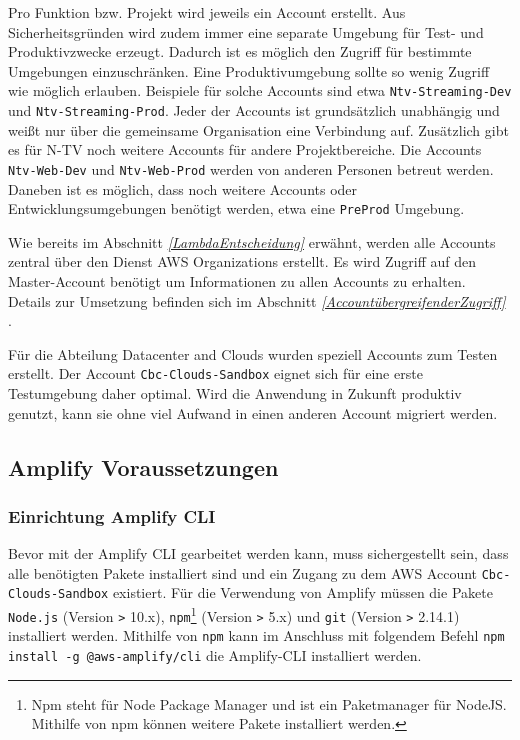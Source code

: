 Pro Funktion bzw. Projekt wird jeweils ein Account erstellt.
Aus Sicherheitsgründen wird zudem immer eine separate Umgebung für Test- und Produktivzwecke erzeugt.
Dadurch ist es möglich den Zugriff für bestimmte Umgebungen einzuschränken.
Eine Produktivumgebung sollte so wenig Zugriff wie möglich erlauben.
Beispiele für solche Accounts sind etwa \verb+Ntv-Streaming-Dev+ und \verb+Ntv-Streaming-Prod+.
Jeder der Accounts ist grundsätzlich unabhängig und weißt nur über die gemeinsame Organisation eine Verbindung auf.
Zusätzlich gibt es für N-TV noch weitere Accounts für andere Projektbereiche.
Die Accounts \verb+Ntv-Web-Dev+ und \verb+Ntv-Web-Prod+ werden von anderen Personen betreut werden.
Daneben ist es möglich, dass noch weitere Accounts oder Entwicklungsumgebungen benötigt werden, etwa eine \verb+PreProd+ Umgebung.

Wie bereits im Abschnitt \textit{\ref{LambdaEntscheidung} } erwähnt, werden alle Accounts zentral über den Dienst AWS Organizations erstellt.
Es wird Zugriff auf den Master-Account benötigt um Informationen zu allen Accounts zu erhalten.
Details zur Umsetzung befinden sich im Abschnitt \textit{\ref{AccountübergreifenderZugriff} }.

Für die Abteilung Datacenter and Clouds wurden speziell Accounts zum Testen erstellt.
Der Account \verb+Cbc-Clouds-Sandbox+ eignet sich für eine erste Testumgebung daher optimal.
Wird die Anwendung in Zukunft produktiv genutzt, kann sie ohne viel Aufwand in einen anderen Account migriert werden.


\subsection{Amplify Voraussetzungen}

\subsubsection{Einrichtung Amplify CLI}
\label{EinrichtungAmplify}
Bevor mit der Amplify CLI gearbeitet werden kann, muss sichergestellt sein, dass alle benötigten Pakete installiert sind und ein Zugang zu dem AWS Account \verb+Cbc-Clouds-Sandbox+ existiert.
Für die Verwendung von Amplify müssen die Pakete \verb+Node.js+ (Version \verb+>+ 10.x), \verb+npm+\footnote{Npm steht für Node Package Manager und ist ein Paketmanager für NodeJS. Mithilfe von npm können weitere Pakete installiert werden.} (Version \verb+>+ 5.x) und \verb+git+ (Version \verb+>+ 2.14.1) installiert werden.
Mithilfe von \verb+npm+ kann im Anschluss mit folgendem Befehl \verb+npm install -g @aws-amplify/cli+ die Amplify-CLI installiert werden.

